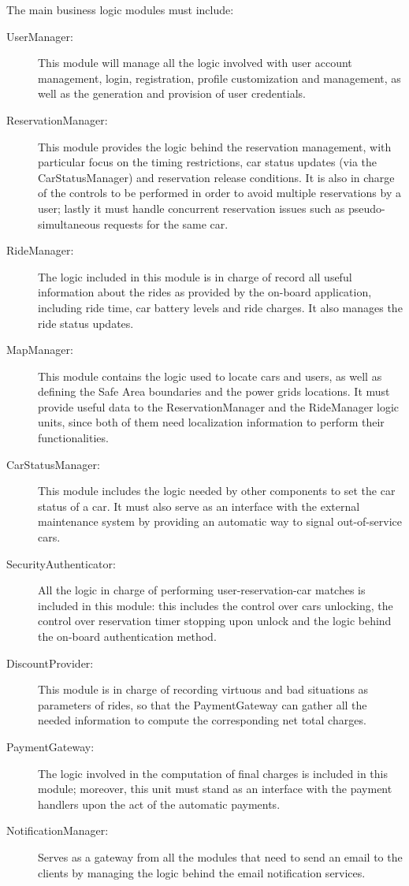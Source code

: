 The main business logic modules must include:

\begin{description}
\item[UserManager:] This module will manage all the logic involved with user account management, login, registration, profile customization and management, as well as the generation and provision of user credentials.
\item[ReservationManager:] This module provides the logic behind the reservation management, with particular focus on the timing restrictions, car status updates (via the CarStatusManager) and reservation release conditions. It is also in charge of the controls to be performed in order to avoid multiple reservations by a user; lastly it must handle concurrent reservation issues such as pseudo-simultaneous requests for the same car.
\item[RideManager:] The logic included in this module is in charge of record all useful information about the rides as provided by the on-board application, including ride time, car battery levels and ride charges. It also manages the ride status updates.
\item[MapManager:] This module contains the logic used to locate cars and users, as well as defining the Safe Area boundaries and the power grids locations. It must provide useful data to the ReservationManager and the RideManager logic units, since both of them need localization information to perform their functionalities.
\item[CarStatusManager:] This module includes the logic needed by other components to set the car status of a car. It must also serve as an interface with the external maintenance system by providing an automatic way to signal out-of-service cars.
\item[SecurityAuthenticator:] All the logic in charge of performing user-reservation-car matches is included in this module: this includes the control over cars unlocking, the control over reservation timer stopping upon unlock and the logic behind the on-board authentication method.
\item[DiscountProvider:] This module is in charge of recording virtuous and bad situations as parameters of rides, so that the PaymentGateway can gather all the needed information to compute the corresponding net total charges.
\item[PaymentGateway:] The logic involved in the computation of final charges is included in this module; moreover, this unit must stand as an interface with the payment handlers upon the act of the automatic payments.
\item[NotificationManager:] Serves as a gateway from all the modules that need to send an email to the clients by managing the logic behind the email notification services.
\end{description}

